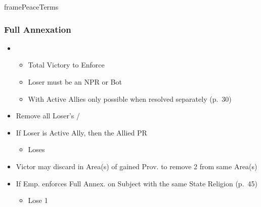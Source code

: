 \documentclass[10pt]{article}
\begin{document}
\begin{dynamiccontents*}{framePeaceTerms}
\begin{multicols}{3}
		\subsubsection*{Full Annexation}
		\begin{itemize}
			\item {}
			\begin{itemize}
				\item Total Victory to Enforce
				\item Loser must be an NPR or Bot
				\item With Active Allies only possible when resolved separately (p.~30)
			\end{itemize}
			\item Remove all Loser's \alliances/\marriages
			\item If Loser is Active Ally, then the Allied PR
			\begin{itemize}
				\item Loses 
			\end{itemize}
			\item Victor may discard \claims in Area(s) of gained Prov. to remove 2 \unrest from same Area(s)
			\item If Emp. enforces Full Annex. on Subject with the same State Religion (p.~45)
			\begin{itemize}
				\item Lose 1\authority
			\end{itemize}
		\end{itemize}


\end{multicols}
\end{dynamiccontents*}
\end{document}
